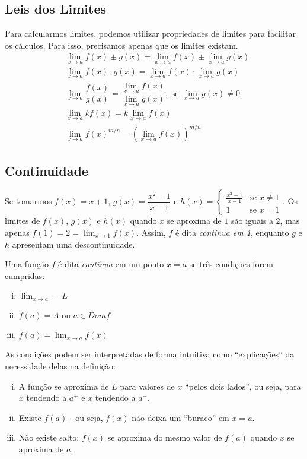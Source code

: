 \subsection{Leis dos Limites}
Para calcularmos limites, podemos utilizar propriedades de limites para facilitar os cálculos. Para isso, precisamos apenas que os limites existam.
\begin{align*}
&\lim_{x \rightarrow a}f(x) \pm g(x)  = \lim_{x \rightarrow a}f(x) \pm \lim_{x \rightarrow a} g(x) \\
&\lim_{x \rightarrow a}f(x) \cdot g(x) = \lim_{x \rightarrow a}f(x) \cdot \lim_{x \rightarrow a}g(x) \\
&\lim_{x \rightarrow a}\dfrac{f(x)}{g(x)} = \dfrac{\lim_{x \rightarrow a}f(x)}{\lim_{x \rightarrow a}g(x)},\textrm{ se }\lim_{x \rightarrow a}g(x) \neq 0 \\
&\lim_{x \rightarrow a}kf(x)=k\lim_{x \rightarrow a}f(x) \\
&\lim_{x \rightarrow a}f(x)^{m/n}=\left(\lim_{x \rightarrow a}f(x)\right)^{m/n}
\end{align*}

\subsection{Continuidade}
Se tomarmos $f(x)=x+1$, $g(x)=\dfrac{x^2-1}{x-1}$ e $h(x)=\begin{cases} \frac{x^2-1}{x-1} &\textrm{se } x \neq 1 \\ 
1 & \textrm{se } x = 1 \end{cases}$. Os limites de $f(x)$, $g(x)$ e $h(x)$ quando $x$ se aproxima de $1$ são iguais a $2$, mas apenas $f(1)=2=\lim_{x\rightarrow 1}f(x)$. Assim, $f$ é dita \emph{contínua em 1}, enquanto $g$ e $h$ apresentam uma descontinuidade.
\begin{df}
Uma função $f$ é dita \emph{contínua} em um ponto $x=a$ se três condições forem cumpridas:
\begin{enumerate}[i)]
\item $\lim_{x\rightarrow a}=L$
\item $f(a)=A$ ou $a\in Dom f$
\item $f(a)=\lim_{x\rightarrow a}f(x)$
\end{enumerate}
\end{df}
As condições podem ser interpretadas de forma intuitiva como ``explicações'' da necessidade delas na definição:
\begin{enumerate}[i)]
\item A função se aproxima de $L$ para valores de $x$ ``pelos dois lados'', ou seja, para $x$ tendendo a $a^+$ e $x$ tendendo a $a^-$.
\item Existe $f(a)$ - ou seja, $f(x)$ não deixa um ``buraco'' em $x=a$.
\item Não existe salto: $f(x)$ se aproxima do mesmo valor de $f(a)$ quando $x$ se aproxima de $a$.
\end{enumerate}

